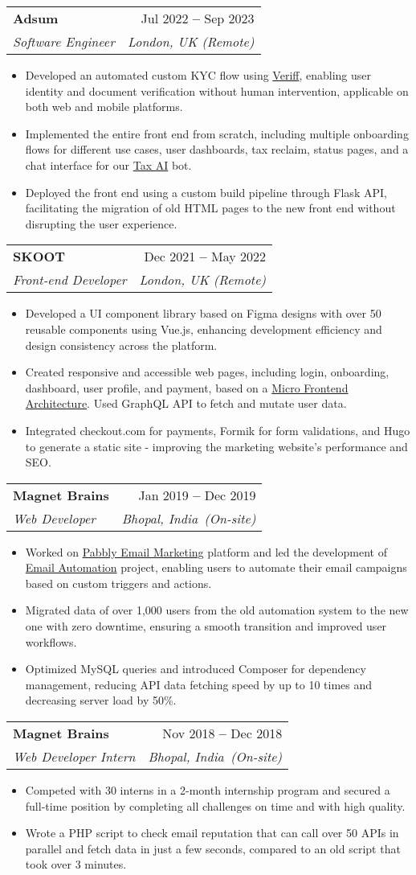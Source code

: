 \documentclass[letterpaper,12pt]{article}
\makeatletter
\newcommand{\resumeItem}[1]{
  \item\small{
    {#1 \vspace{-2pt}}
  }
}
\newcommand{\resumeSubheading}[5]{
  \vspace{-2pt}\item
    \begin{tabular*}{0.97\textwidth}[t]{l@{\extracolsep{\fill}}r}
      \textbf{#1} \iconLink{#2} & \small #3 \\
      \textit{\small#4} & \textit{\small #5} \\
    \end{tabular*}\vspace{-7pt}
}
\newcommand{\iconLink}[1]{
    \small\href{#1}{\color{blue}\faExternalLink}
}
\newcommand{\resumeItemListStart}{\begin{itemize}}
\newcommand{\resumeItemListEnd}{\end{itemize}\vspace{-5pt}}
\def\myHometown{Bhopal, India}
\def\adsumLink{https://adsum-works.com}
\def\skootLink{https://skoot.eco}
\def\magnetBrainsLink{https://magnetbrains.com}
\def\microFrontendLink{https://micro-frontends.org}
\def\taxaiLink{https://chat.taxai.uk}
\def\veriffLink{https://veriff.com}
\def\pabblyLink{https://pabbly.com/email-marketing}
\def\emailAutomationLink{https://youtube.com/watch?v=kkopsVYOO7Y}
\makeatother
\begin{document}
\resumeSubheading
{Adsum}{\adsumLink}{Jul 2022 \textbf{--} Sep 2023}
{Software Engineer}{London, UK (Remote)}
\resumeItemListStart
\resumeItem{Developed an automated custom KYC flow using \href{\veriffLink}{\color{blue}Veriff}, enabling user identity and document verification without human intervention, applicable on both web and mobile platforms.}
\resumeItem{Implemented the entire front end from scratch, including multiple onboarding flows for different use cases, user dashboards, tax reclaim, status pages, and a chat interface for our \href{\taxaiLink}{\color{blue}Tax AI} bot.}
\resumeItem{Deployed the front end using a custom build pipeline through Flask API, facilitating the migration of old HTML pages to the new front end without disrupting the user experience.}
\resumeItemListEnd

\resumeSubheading
{SKOOT}{\skootLink}{Dec 2021 \textbf{--} May 2022}
{Front-end Developer}{London, UK (Remote)}
\resumeItemListStart
\resumeItem{Developed a UI component library based on Figma designs with over 50 reusable components using Vue.js, enhancing development efficiency and design consistency across the platform.}
\resumeItem{Created responsive and accessible web pages, including login, onboarding, dashboard, user profile, and payment, based on a \href{\microFrontendLink}{\color{blue}Micro Frontend Architecture}. Used GraphQL API to fetch and mutate user data.}
\resumeItem{Integrated checkout.com for payments, Formik for form validations, and Hugo to generate a static site - improving the marketing website's performance and SEO.}
\resumeItemListEnd

\resumeSubheading
{Magnet Brains}{\magnetBrainsLink}{Jan 2019 \textbf{--} Dec 2019}
{Web Developer}{\myHometown\ (On-site)}
\resumeItemListStart
\resumeItem{Worked on \href{\pabblyLink}{\color{blue}Pabbly Email Marketing} platform and led the development of \href{\emailAutomationLink}{\color{blue}Email Automation} project, enabling users to automate their email campaigns based on custom triggers and actions.}
\resumeItem{Migrated data of over 1,000 users from the old automation system to the new one with zero downtime, ensuring a smooth transition and improved user workflows.}
\resumeItem{Optimized MySQL queries and introduced Composer for dependency management, reducing API data fetching speed by up to 10 times and decreasing server load by 50\%.}
\resumeItemListEnd

\resumeSubheading
{Magnet Brains}{\magnetBrainsLink}{Nov 2018 \textbf{--} Dec 2018}
{Web Developer Intern}{\myHometown\ (On-site)}
\resumeItemListStart
\resumeItem{Competed with 30 interns in a 2-month internship program and secured a full-time position by completing all challenges on time and with high quality.}
\resumeItem{Wrote a PHP script to check email reputation that can call over 50 APIs in parallel and fetch data in just a few seconds, compared to an old script that took over 3 minutes.}
\resumeItemListEnd
\end{document}
